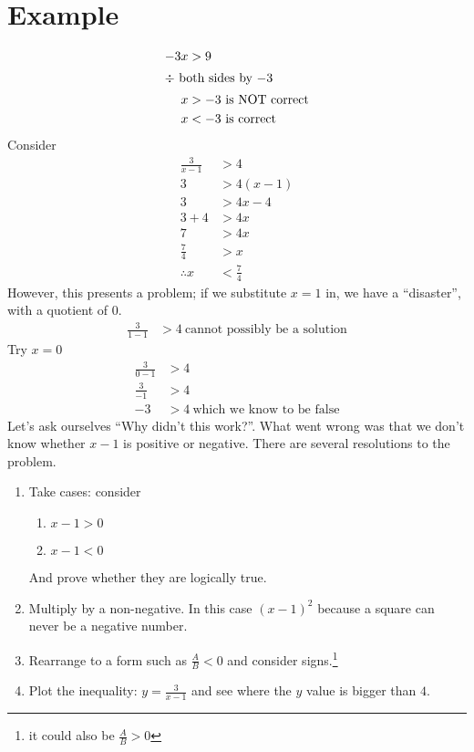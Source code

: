 \section{Example}
\begin{align}
  -3x & > 9 \\
\intertext{$\div$ both sides by  $-3$}
  x & > -3~ \text{is NOT correct} \nonumber \\
  x & < -3 ~ \text{is correct}
\end{align}
Consider
\begin{align}
  \frac{3}{x-1} & > 4 \\
  3 & > 4(x-1) \\
  3 & > 4x - 4 \\
  3 + 4 & > 4x \\
  7 & > 4x \\
  \frac{7}{4} & > x \\
  \therefore x & < \frac{7}{4}
\end{align}
However, this presents a problem; if we substitute $x=1$ in, we have a
``disaster'', with a quotient of $0$.
\begin{align}
  \frac{3}{1 - 1} & > 4~\text{cannot possibly be a solution}
\end{align}
Try $x=0$
\begin{align}
  \frac{3}{0 - 1} & > 4 \\
  \frac{3}{-1} & > 4 \\
  -3 & > 4~\text{which we know to be false}
\end{align}
Let's ask ourselves ``Why didn't this work?''. What went wrong was that we don't
know whether $x-1$ is positive or negative. There are several resolutions to the
problem.
\begin{enumerate}
  \item Take cases: consider
  \begin{enumerate}
    \item $x-1 > 0$
    \item $x-1 < 0$
  \end{enumerate}
  And prove whether they are logically true.
  \item Multiply by a non-negative. In this case $(x-1)^2$ because a square can
  never be a negative number.
  \item Rearrange to a form such as $\frac{A}{B} < 0$ and consider
  signs.\footnote{it could also be $\frac{A}{B} > 0$}
  \item Plot the inequality: $y = \frac{3}{x-1}$ and see where the $y$ value is
  bigger than $4$.
\end{enumerate}

